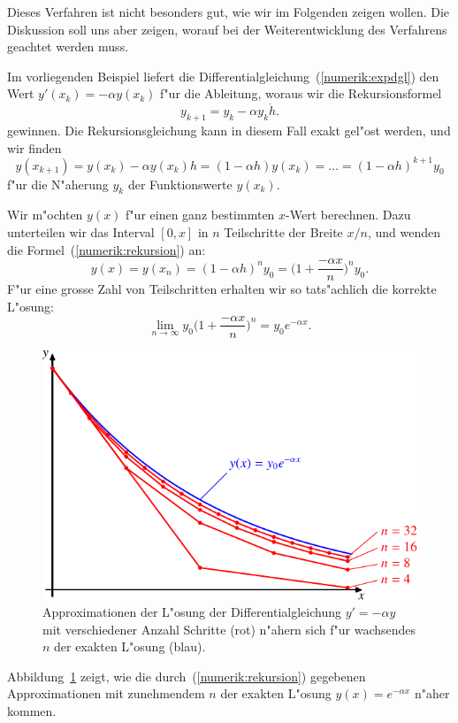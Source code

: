 Dieses Verfahren ist nicht besonders gut, wie wir im Folgenden zeigen
wollen.
Die Diskussion soll uns aber zeigen, worauf bei der Weiterentwicklung
des Verfahrens geachtet werden muss.

Im vorliegenden Beispiel liefert die
Differentialgleichung~(\ref{numerik:expdgl})
den Wert $y'(x_k)=-\alpha y(x_k)$ f"ur die Ableitung,
woraus wir die Rekursionsformel
\[
y_{k+1}=y_k - \alpha y_k \dot h.
\]
gewinnen.
Die Rekursionsgleichung kann in diesem Fall exakt gel"ost werden,
und wir finden
\begin{equation}
y(x_{k+1}) = y(x_k)-\alpha y(x_k) h=(1-\alpha h) y(x_k)=\dots
=(1-\alpha h)^{k+1}y_0
\label{numerik:rekursion}
\end{equation}
f"ur die N"aherung $y_k$ der Funktionswerte $y(x_k)$.



Wir m"ochten $y(x)$ f"ur einen ganz bestimmten $x$-Wert berechnen.
Dazu unterteilen wir das Interval $[0,x]$ in $n$ Teilschritte der
Breite $x/n$, und wenden die Formel~(\ref{numerik:rekursion}) an:
\[
y(x)=y(x_n)=(1-\alpha h)^n y_0=\biggl(1+\frac{-\alpha x}{n}\biggr)^n y_0.
\]
F"ur eine grosse Zahl von Teilschritten erhalten wir so tats"achlich die
korrekte L"osung:
\[
\lim_{n\to\infty}y_0\biggl(1+\frac{-\alpha x}n\biggr)^n=y_0 e^{-\alpha x}.
\]
\begin{figure}
\centering
\includegraphics{chapters/images/numerik-1.pdf}
\caption{Approximationen der L"osung der Differentialgleichung $y'=-\alpha y$
mit verschiedener Anzahl Schritte (rot) n"ahern sich f"ur wachsendes
$n$ der exakten L"osung (blau).
\label{numerik:approximation}}
\end{figure}%
Abbildung~\ref{numerik:approximation} zeigt, wie die
durch~(\ref{numerik:rekursion}) gegebenen Approximationen mit zunehmendem
$n$ der exakten L"osung $y(x)=e^{-\alpha x}$ n"aher kommen.

